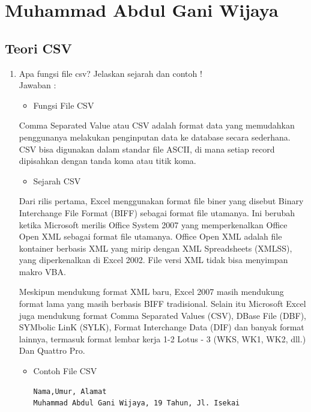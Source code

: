 

\section{Muhammad Abdul Gani Wijaya}
\subsection{Teori CSV}
\begin{enumerate}
\item Apa fungsi file csv? Jelaskan sejarah dan contoh !\\
Jawaban :

\begin{itemize}
\item Fungsi File CSV
\end{itemize}

Comma Separated Value atau CSV adalah format data yang memudahkan penggunanya melakukan penginputan data ke database secara sederhana. CSV bisa digunakan dalam standar file ASCII, di mana setiap record dipisahkan dengan tanda koma atau titik koma.

\begin{itemize}
\item Sejarah CSV
\end{itemize}

Dari rilis pertama, Excel menggunakan format file biner yang disebut Binary Interchange File Format (BIFF) sebagai format file utamanya. Ini berubah ketika Microsoft merilis Office System 2007 yang memperkenalkan Office Open XML sebagai format file utamanya. Office Open XML adalah file kontainer berbasis XML yang mirip dengan XML Spreadsheets (XMLSS), yang diperkenalkan di Excel 2002. File versi XML tidak bisa menyimpan makro VBA.

Meskipun mendukung format XML baru, Excel 2007 masih mendukung format lama yang masih berbasis BIFF tradisional. Selain itu Microsoft Excel juga mendukung format Comma Separated Values (CSV), DBase File (DBF), SYMbolic LinK (SYLK), Format Interchange Data (DIF) dan banyak format lainnya, termasuk format lembar kerja 1-2 Lotus - 3 (WKS, WK1, WK2, dll.) Dan Quattro Pro.


\begin{itemize}
\item Contoh File CSV
\begin{verbatim}
Nama,Umur, Alamat
Muhammad Abdul Gani Wijaya, 19 Tahun, Jl. Isekai
\end{verbatim}
\end{itemize}



\end{enumerate}
